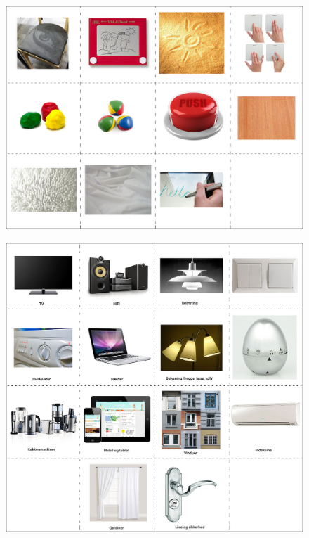 \begin{figure}[h]
\centering
\begin{minipage}[t]{.5\textwidth}
  \centering
  \includegraphics[width=0.9\linewidth]{workshops/technology-cards}
  \label{ch:workshops:technology-cards}
\end{minipage}%
\begin{minipage}[t]{.5\textwidth}
  \centering
  \includegraphics[width=0.9\linewidth]{workshops/appliance-cards}
  \label{ch:workshops:appliance-cards}
\end{minipage}
\end{figure}

